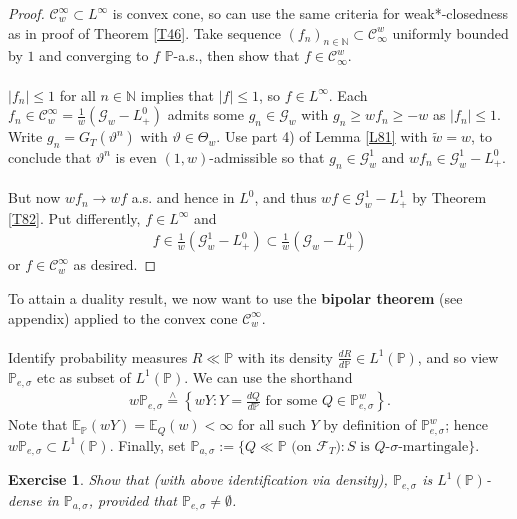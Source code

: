 \documentclass[12pt,a4paper, twoside]{article}
\newtheorem{exe}{Exercise}[section]
\theoremstyle{definition}
\newcommand{\EE}{\mathbb{E}} %
\newcommand{\PP}{\mathbb{P}} %
\newcommand{\teq}{\overset{\wedge}{=}}
\begin{document}
\begin{proof}
$\mathcal{C}_w^\infty \subset L^\infty$ is convex cone, so can use the same criteria for weak*-closedness as in proof of Theorem \ref{T46}. Take sequence $(f_n)_{n \in \mathbb{N}} \subset \mathcal{C}_\infty^w$ uniformly bounded by $1$ and converging to $f$ $\PP$-a.s., then show that $f \in \mathcal{C}_\infty^w$. \\
\\
$|f_n| \leq 1$ for all $n \in \mathbb{N}$ implies that $|f| \leq 1$, so $f \in L^\infty$. Each $f_n \in \mathcal{C}_w^\infty = \frac{1}{w}( \mathcal{G}_w-L_+^0)$ admits some $g_n \in \mathcal{G}_w$ with $g_n \geq wf_n \geq -w$ as $|f_n| \leq 1$. Write $g_n = G_T( \vartheta^n)$ with $\vartheta \in \Theta_w$. Use part 4) of Lemma \ref{L81} with $\widetilde{w}=w$, to conclude that $\vartheta^n$ is even $(1,w)$-admissible so that $g_n \in \mathcal{G}_w^1$ and $wf_n \in \mathcal{G}_w^1-L_+^0$. \\
\\
But now $wf_n \to wf$ a.s. and hence in $L^0$, and thus $wf \in \mathcal{G}_w^1-L_+^1$ by Theorem \ref{T82}. Put differently,  $f \in L^\infty$ and 
\begin{align*}
f \in \frac{1}{w}( \mathcal{G}_w^1- L_+^0) \subset \frac{1}{w}( \mathcal{G}_w-L_+^0)
\end{align*}
or $f \in \mathcal{C}_w^\infty$ as desired. 
\end{proof}
To attain a duality result, we now want to use the \textbf{bipolar theorem} (see appendix) applied to the convex cone $\mathcal{C}_w^\infty$. \\
\\
Identify probability measures $R \ll \PP$ with its density $\frac{dR}{d\PP} \in L^1(\PP)$, and so view $\PP_{e, \sigma}$ etc as subset of $L^1( \PP)$. We can use the shorthand 
\begin{align*}
w \PP_{e, \sigma} \teq \left\{ wY : Y = \frac{dQ}{d\PP} \text{ for some } Q \in \PP_{e, \sigma}^w\right\}.
\end{align*} 
Note that $\EE_\PP(wY)= \EE_Q(w) < \infty$ for all such $Y$ by definition of $\PP_{e, \sigma}^w$; hence $w \PP_{e, \sigma} \subset L^1 ( \PP)$. Finally, set $\PP_{a, \sigma}:= \{ Q \ll \PP \text{ (on $\mathcal{F}_T$)} : S \text{ is $Q$-$\sigma$-martingale}\}$.
\begin{exe} Show that (with above identification via density), $\PP_{e, \sigma}$ is $L^1(\PP)$-dense in $\PP_{a, \sigma}$, provided that $\PP_{e, \sigma} \neq \emptyset$.
\end{exe} 
\end{document}
